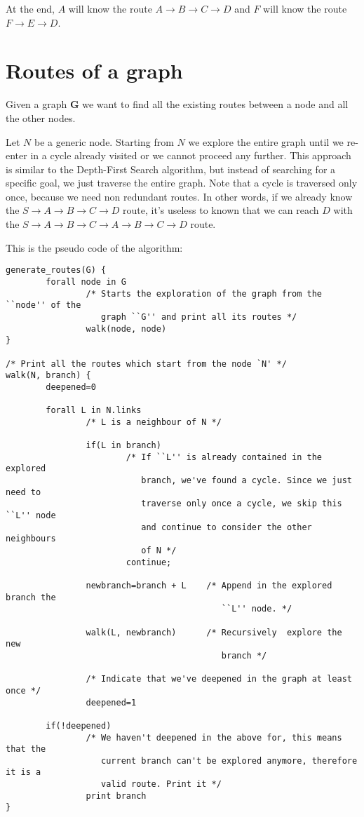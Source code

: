 \documentclass[a4paper]{article}
\begin{document}
At the end, $A$ will know the route $A \rightarrow B \rightarrow C \rightarrow D$ and $F$ will know the
route $F \rightarrow E \rightarrow D$.

\section{Routes of a graph}
\label{sec:gen_routes}

Given a graph $\mathbf{G}$ we want to find all the existing routes between a node and
all the other nodes.

Let $N$ be a generic node. Starting from $N$ we explore the entire graph
until we re-enter in a cycle already visited or we cannot proceed any further.
This approach is similar to the Depth-First Search\cite{DFS} algorithm, but instead of
searching for a specific goal, we just traverse the entire graph.
Note that a cycle is traversed only once, because we need non redundant
routes. In other words, if we already know the $S \rightarrow A \rightarrow B
\rightarrow C \rightarrow D$ route,
it's useless to known that we can reach $D$ with the $S \rightarrow A
\rightarrow B \rightarrow C \rightarrow A \rightarrow B \rightarrow C
\rightarrow D$ route.

This is the pseudo code of the algorithm:

\begin{verbatim}
generate_routes(G) {
        forall node in G
                /* Starts the exploration of the graph from the ``node'' of the
                   graph ``G'' and print all its routes */
                walk(node, node)
}

/* Print all the routes which start from the node `N' */
walk(N, branch) {
        deepened=0

        forall L in N.links
                /* L is a neighbour of N */

                if(L in branch)
                        /* If ``L'' is already contained in the explored
                           branch, we've found a cycle. Since we just need to
                           traverse only once a cycle, we skip this ``L'' node
                           and continue to consider the other neighbours
                           of N */
                        continue;

                newbranch=branch + L    /* Append in the explored branch the
                                           ``L'' node. */

                walk(L, newbranch)      /* Recursively  explore the new
                                           branch */
                
                /* Indicate that we've deepened in the graph at least once */
                deepened=1

        if(!deepened)
                /* We haven't deepened in the above for, this means that the
                   current branch can't be explored anymore, therefore it is a
                   valid route. Print it */
                print branch
}
\end{verbatim}
\end{document}
